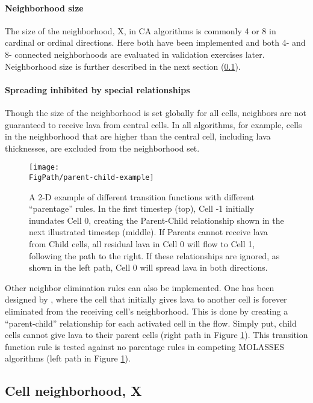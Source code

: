 		\paragraph{Neighborhood size} The size of the neighborhood, X, in CA algorithms is commonly 4 or 8 in cardinal or ordinal directions. Here both have been implemented and both 4- and 8- connected neighborhoods are evaluated in validation exercises later. Neighborhood size is further described in the next section (\ref{sec_X}).

		\paragraph{Spreading inhibited by special relationships} Though the size of the neighborhood is set globally for all cells, neighbors are not guaranteed to receive lava from central cells. In all algorithms, for example, cells in the neighborhood that are higher than the central cell, including lava thicknesses, are excluded from the neighborhood set.
		
		\begin{figure}[!h]
			\centering
			\texttt{[image: \\FigPath/parent-child-example]}
			\caption[A 2-D example of different transition functions with different ``parentage'' rules]{A 2-D example of different transition functions with different ``parentage'' rules. In the first timestep (top), Cell -1 initially inundates Cell 0, creating the Parent-Child relationship shown in the next illustrated timestep (middle). If Parents cannot receive lava from Child cells, all residual lava in Cell 0 will flow to Cell 1, following the path to the right. If these relationships are ignored, as shown in the left path, Cell 0 will spread lava in both directions.}
			\label{fig_ParentTrap}
		\end{figure}
		
		Other neighbor elimination rules can also be implemented. One has been designed by \citet{connor2012probabilistic}, where the cell that initially gives lava to another cell is forever eliminated from the receiving cell's neighborhood. This is done by creating a ``parent-child'' relationship for each activated cell in the flow. Simply put, child cells cannot give lava to their parent cells (right path in Figure \ref{fig_ParentTrap}). This transition function rule is tested against no parentage rules in competing MOLASSES algorithms (left path in Figure \ref{fig_ParentTrap}).
		
	\subsection{Cell neighborhood, X}\label{sec_X}
	
